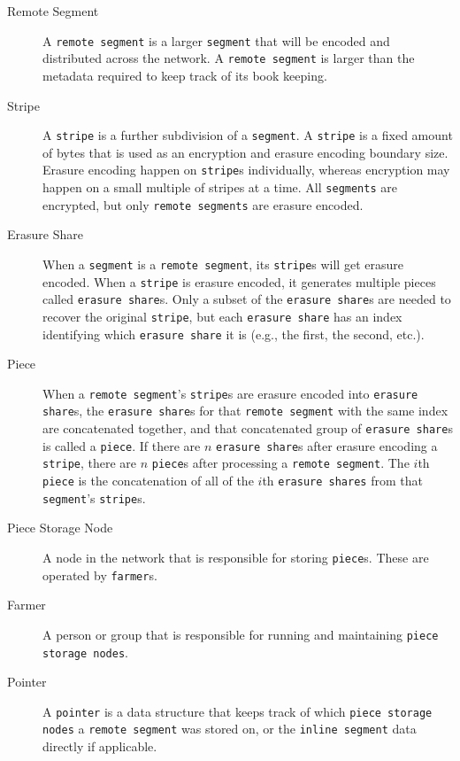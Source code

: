 \documentclass[a4paper,10pt]{article} \usepackage[utf8]{inputenc}
\newcommand{\x}[1]{{\tt #1}} \newcommand{\code}[1]{{\tt #1}}
\begin{document}
\begin{description}
\item[Remote Segment] A \x{remote segment} is a larger \x{segment} that will be
encoded and distributed across the network. A \x{remote segment} is larger than
the metadata required to keep track of its book keeping.

\item[Stripe] A \x{stripe} is a further subdivision of a \x{segment}. A
\x{stripe} is a fixed amount of bytes that is used as an encryption and erasure
encoding boundary size. Erasure encoding happen on \x{stripe}s individually,
whereas encryption may happen on a small multiple of stripes at a time. All
\x{segments} are encrypted, but only \x{remote segments} are erasure encoded.

\item[Erasure Share] When a \x{segment} is a \x{remote segment}, its \x{stripe}s
will get erasure encoded. When a \x{stripe} is erasure encoded, it generates
multiple pieces called \x{erasure share}s. Only a subset of the \x{erasure
share}s are needed to recover the original \x{stripe}, but each \x{erasure
share} has an index identifying which \x{erasure share} it is (e.g., the first,
the second, etc.).

\item[Piece] When a \x{remote segment}'s \x{stripe}s are erasure encoded into
\x{erasure share}s, the \x{erasure share}s for that \x{remote segment} with the
same index are concatenated together, and that concatenated group of \x{erasure
share}s is called a \x{piece}. If there are $n$ \x{erasure share}s after erasure
encoding a \x{stripe}, there are $n$ \x{piece}s after processing a \x{remote
segment}. The $i$th \x{piece} is the concatenation of all of the $i$th
\x{erasure shares} from that \x{segment}'s \x{stripe}s.

\item[Piece Storage Node] A node in the network that is responsible for storing
\x{piece}s. These are operated by \x{farmer}s.

\item[Farmer] A person or group that is responsible for running and maintaining
\x{piece storage nodes}.

\item[Pointer] A \x{pointer} is a data structure that keeps track of which
\x{piece storage nodes} a \x{remote segment} was stored on, or the \x{inline
segment} data directly if applicable.

\end{description}
\end{document}
